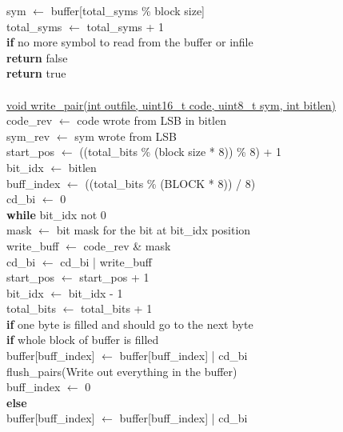 \documentclass[12pt]{article}
\begin{document}
\indent *sym $\leftarrow$ buffer[total\_syms \% block size] \\
\indent total\_syms $\leftarrow$ total\_syms + 1 \\
\indent \textbf{if} no more symbol to read from the buffer or infile \\
\indent \indent \textbf{return} false \\
\indent \textbf{return} true \\
\\
\underline{void write\_pair(int outfile, uint16\_t code, uint8\_t sym, int bitlen)} \\
\indent code\_rev $\leftarrow$ code wrote from LSB in bitlen \\
\indent sym\_rev $\leftarrow$ sym wrote from LSB \\
\indent start\_pos $\leftarrow$ ((total\_bits \% (block size * 8)) \% 8) + 1 \\
\indent bit\_idx $\leftarrow$ bitlen \\
\indent buff\_index $\leftarrow$ ((total\_bits \% (BLOCK * 8)) / 8) \\
\indent cd\_bi $\leftarrow$ 0 \\
\indent \textbf{while} bit\_idx not 0 \\
\indent \indent mask $\leftarrow$ bit mask for the bit at bit\_idx position \\
\indent \indent write\_buff $\leftarrow$ code\_rev \& mask \\
\indent \indent cd\_bi $\leftarrow$ cd\_bi | write\_buff \\
\indent \indent start\_pos $\leftarrow$ start\_pos + 1 \\
\indent \indent bit\_idx $\leftarrow$ bit\_idx - 1 \\
\indent \indent total\_bits $\leftarrow$ total\_bits + 1 \\
\indent \indent \textbf{if} one byte is filled and should go to the next byte \\
\indent \indent \indent \textbf{if} whole block of buffer is filled \\
\indent \indent \indent \indent buffer[buff\_index] $\leftarrow$ buffer[buff\_index] | cd\_bi \\
\indent \indent \indent \indent flush\_pairs(Write out everything in the buffer) \\
\indent \indent \indent \indent buff\_index $\leftarrow$ 0 \\
\indent \indent \indent \textbf{else} \\
\indent \indent \indent \indent buffer[buff\_index] $\leftarrow$ buffer[buff\_index] | cd\_bi \\
\end{document}
